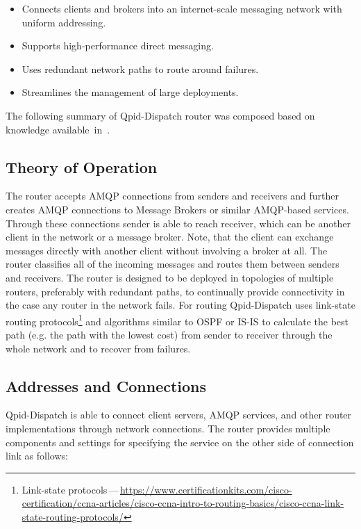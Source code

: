 \begin{itemize}
	\setlength\itemsep{0em}
	\item Connects clients and brokers into an internet-scale messaging network with uniform addressing.
	\item Supports high-performance direct messaging.
	\item Uses redundant network paths to route around failures.
	\item Streamlines the management of large deployments.
\end{itemize}
The following summary of Qpid-Dispatch router was composed based on knowledge available~in~\cite{RH:Interconnect}.


\subsection{Theory of Operation}
The router accepts AMQP connections from senders and receivers and further creates AMQP connections to Message Brokers or similar AMQP-based services. Through these connections sender is able to reach receiver, which can be another client in the network or a message broker. Note, that the client can exchange messages directly with another client without involving a broker at all. The router classifies all of the incoming messages and routes them between senders and receivers. The router is designed to be deployed in topologies of multiple routers, preferably with redundant paths, to continually provide connectivity in the case any router in the network fails. For routing Qpid-Dispatch uses link-state routing protocols\footnote{Link-state protocols\,---\,\url{https://www.certificationkits.com/cisco-certification/ccna-articles/cisco-ccna-intro-to-routing-basics/cisco-ccna-link-state-routing-protocols/}} and algorithms similar to OSPF or IS-IS to calculate the best path (e.g. the path with the lowest cost) from sender to receiver through the whole network and to recover from failures.

\subsection{Addresses and Connections}
\label{Addresses and Connections}
Qpid-Dispatch is able to connect client servers, AMQP services, and other router implementations through network connections. The router provides multiple components and settings for specifying the service on the other side of connection link as follows:

